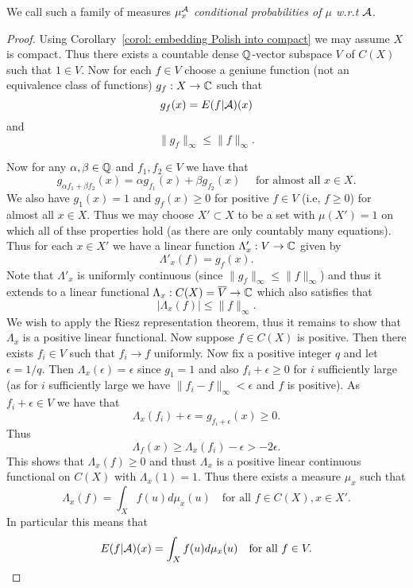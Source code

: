 \documentclass[twoside, a4paper, 10pt]{amsart}
\begin{document}
\begin{mydef} We call such a family of measures $\mu^{\mathcal{A}}_x$ \textit{conditional probabilities of $\mu$ w.r.t $\mathcal{A}$}.

\end{mydef}

\begin{proof} Using Corollary~\ref{corol: embedding Polish into compact} we may assume $X$ is compact. Thus there exists a countable dense $\mathbb{Q}$-vector subspace $V$ of $C(X)$ such that $1 \in V$. Now for each $f \in V$ choose a geniune function (not an equivalence class of functions) $g_f:X \to \mathbb{C}$ such that $$g_f(x) = E(f|\mathcal{A})(x)$$ and $$\|g_f\|_{\infty} \leq \|f\|_{\infty}.$$

 Now for any $\alpha,\beta \in \mathbb{Q}$ and $f_1,f_2 \in V$ we have that $$g_{\alpha f_1 + \beta f_2}(x) = \alpha g_{f_1}(x) + \beta g_{f_2}(x)\quad \text{ for almost all } x \in X.$$ We also have $g_1(x) = 1$ and $g_f(x) \geq 0$ for positive $f \in V$ (i.e, $f\geq 0$) for almost all $x \in X$. Thus we may choose $X' \subset X$ to be a set with $\mu(X')=1$ on which all of thse properties hold (as there are only countably many equations). Thus for each $x \in X'$ we have a linear function $\Lambda'_x: V \to \mathbb{C}$ given by $$\Lambda'_x (f)= g_f(x).$$ Note that $\Lambda'_x$ is uniformly continuous (since $\|g_f\|_{\infty} \leq \|f\|_{\infty}$) and thus it extends to a linear functional $\Lambda_x:C(X) = \overline{V} \to \mathbb{C}$ which also satisfies that $$|\Lambda_x (f)| \leq \|f\|_{\infty}.$$ We wish to apply the Riesz representation theorem, thus it remains to show that $\Lambda_x$ is a positive linear functional. Now suppose $f \in C(X)$ is positive. Then there exists $f_i \in V$ such that $f_i \to f$ uniformly. Now fix a positive integer $q$ and let $\epsilon = 1/q$. Then $\Lambda_x(\epsilon) = \epsilon$ since $g_1=1$ and also $f_i + \epsilon \geq 0$ for $i$ sufficiently large (as for $i$ sufficiently large we have $\|f_i - f\|_{\infty} < \epsilon$ and $f$ is positive). As $f_i + \epsilon \in V$ we have that $$\Lambda_x(f_i) + \epsilon = g_{f_i + \epsilon}(x) \geq 0.$$ Thus $$\Lambda_f(x) \geq \Lambda_x(f_i) - \epsilon> -2\epsilon.$$ This shows that $\Lambda_x(f) \geq 0$ and thust $\Lambda_x$ is a positive linear continuous functional on $C(X)$ with $\Lambda_x(1)=1$. Thus there exists a measure $\mu_x$ such that $$\Lambda_x(f) = \int_X f(u) d\mu_x(u) \quad \text{for all } f \in C(X), x \in X'.$$ In particular this means that $$ E(f|\mathcal{A})(x) = \int_X f(u) d\mu_x(u) \quad \text{for all } f \in V.$$


\end{proof}
\end{document}
